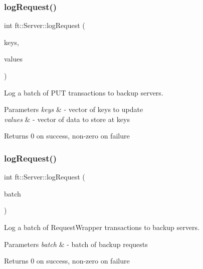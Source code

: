 \subsubsection{\texorpdfstring{log\+Request()}{logRequest()}\hspace{0.1cm}{\footnotesize\ttfamily [2/3]}}
{\footnotesize\ttfamily int ft\+::\+Server\+::log\+Request (\begin{DoxyParamCaption}\item[{std\+::vector$<$ unsigned long long $>$}]{keys,  }\item[{std\+::vector$<$ data\+\_\+t $\ast$$>$}]{values }\end{DoxyParamCaption})}

Log a batch of P\+UT transactions to backup servers.


\begin{DoxyParams}{Parameters}
{\em keys} & -\/ vector of keys to update \\
\hline
{\em values} & -\/ vector of data to store at keys\\
\hline
\end{DoxyParams}
\begin{DoxyReturn}{Returns}
0 on success, non-\/zero on failure 
\end{DoxyReturn}
\mbox{\label{classft_1_1Server_ada92c4dbf92ee02bb99be77a9faae1e2}} 
\subsubsection{\texorpdfstring{log\+Request()}{logRequest()}\hspace{0.1cm}{\footnotesize\ttfamily [3/3]}}
{\footnotesize\ttfamily int ft\+::\+Server\+::log\+Request (\begin{DoxyParamCaption}\item[{std\+::vector$<$ Request\+Wrapper$<$ unsigned long long, data\+\_\+t $\ast$$>$$>$}]{batch }\end{DoxyParamCaption})}

Log a batch of Request\+Wrapper transactions to backup servers.


\begin{DoxyParams}{Parameters}
{\em batch} & -\/ batch of backup requests\\
\hline
\end{DoxyParams}
\begin{DoxyReturn}{Returns}
0 on success, non-\/zero on failure 
\end{DoxyReturn}
\mbox{\label{classft_1_1Server_a0c333cc78d88ff7ada32ffff429a8788}} 
